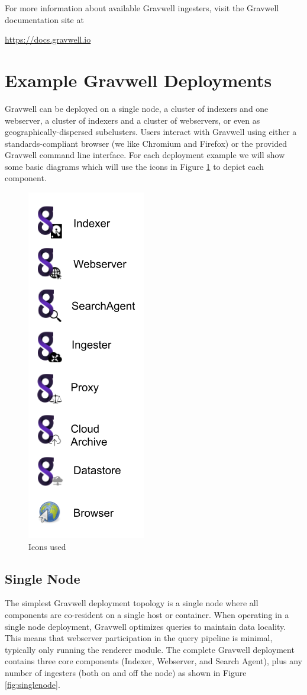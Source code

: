 For more information about available
Gravwell ingesters, visit the Gravwell documentation site at
{\href{https://docs.gravwell.io}{https://docs.gravwell.io}

\clearpage
\section{Example Gravwell Deployments}

Gravwell can be deployed on a single node, a cluster of indexers and one webserver, a
cluster of indexers and a cluster of webservers, or even as geographically-dispersed subclusters.
Users interact with Gravwell using either a standards-compliant browser
(we like Chromium and Firefox) or the provided Gravwell command line
interface. For each deployment example we will show some basic diagrams
which will use the icons in Figure \ref{fig:archicons} to depict each component.

\begin{figure}
	\includegraphics[width=0.2\linewidth]{images/archicons.png}
	\caption{Icons used}
	\label{fig:archicons}
\end{figure}

\subsection{Single Node}

The simplest Gravwell deployment topology is a single node where all
components are co-resident on a single host or container. When
operating in a single node deployment, Gravwell optimizes queries to
maintain data locality. This means that webserver participation in the
query pipeline is minimal, typically only running the renderer module.
The complete Gravwell deployment contains three core components (Indexer,
Webserver, and Search Agent), plus any number of ingesters (both on and off the node) as shown in Figure \ref{fig:singlenode}.

}
